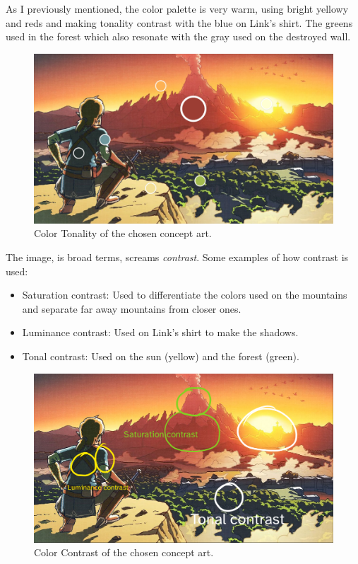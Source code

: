 \documentclass{cup-pan}
\begin{document}
            As I previously mentioned, the color palette is very warm, using bright yellowy and reds and making tonality contrast with the blue on Link's shirt.
            The greens used in the forest which also resonate with the gray used on the destroyed wall. \\
            \begin{figure}[H]
                \includegraphics[width=\textwidth]{Imagenes/Referencias/Analisis_ConceptArt/tonalidad.png}
                \caption{Color Tonality of the chosen concept art.}
            \end{figure}

            The image, is broad terms, screams \textit{contrast}. Some examples of how contrast is used:
            \begin{itemize}
                \item Saturation contrast: Used to differentiate the colors used on the mountains and separate far away mountains from closer ones.
                \item Luminance contrast: Used on Link's shirt to make the shadows. 
                \item Tonal contrast: Used on the sun (yellow) and the forest (green). 
            \end{itemize}
            \begin{figure}[H]
                \includegraphics[width=\textwidth]{Imagenes/Referencias/Analisis_ConceptArt/contrast.png}
                \caption{Color Contrast of the chosen concept art.}
            \end{figure}
\end{document}
